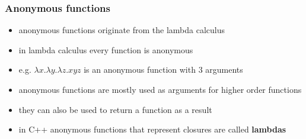 \begin{frame}[fragile]
    \frametitle{Anonymous functions}
    \begin{itemize}
        \item anonymous functions originate from the lambda calculus
        \item in lambda calculus every function is anonymous
        \item e.g. $ \lambda x. \lambda y. \lambda z. x y z $ is an anonymous function with 3 arguments
        \item anonymous functions are mostly used as arguments for higher order functions
        \item they can also be used to return a function as a result
        \item in C++ anonymous functions that represent closures are called \textbf{lambdas}
    \end{itemize}
\end{frame}

